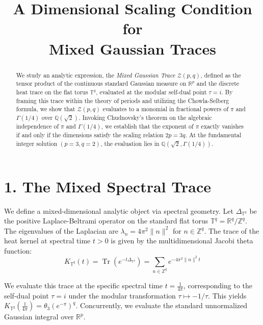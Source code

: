 \documentclass[12pt]{article}
\begin{document}
\title{\textbf{A Dimensional Scaling Condition for \\ Mixed Gaussian Traces}}
\author{}
\date{}
\maketitle

\begin{abstract}
\noindent We study an analytic expression, the \textit{Mixed Gaussian Trace} $\mathcal{Z}(p, q)$, defined as the tensor product of the continuous standard Gaussian measure on $\mathbb{R}^p$ and the discrete heat trace on the flat torus $\mathbb{T}^q$, evaluated at the modular self-dual point $\tau = i$. By framing this trace within the theory of periods and utilizing the Chowla-Selberg formula, we show that $\mathcal{Z}(p, q)$ evaluates to a monomial in fractional powers of $\pi$ and $\Gamma(1/4)$ over $\mathbb{Q}(\sqrt{2})$. Invoking Chudnovsky's theorem on the algebraic independence of $\pi$ and $\Gamma(1/4)$, we establish that the exponent of $\pi$ exactly vanishes if and only if the dimensions satisfy the scaling relation $2p = 3q$. At the fundamental integer solution $(p=3, q=2)$, the evaluation lies in $\mathbb{Q}(\sqrt{2}, \Gamma(1/4))$.
\end{abstract}

\vspace{0.5cm}

\section*{1. The Mixed Spectral Trace}
We define a mixed-dimensional analytic object via spectral geometry. Let $\Delta_{\mathbb{T}^q}$ be the positive Laplace-Beltrami operator on the standard flat torus $\mathbb{T}^q = \mathbb{R}^q / \mathbb{Z}^q$. The eigenvalues of the Laplacian are $\lambda_n = 4\pi^2 \|n\|^2$ for $n \in \mathbb{Z}^q$. The trace of the heat kernel at spectral time $t > 0$ is given by the multidimensional Jacobi theta function:
\begin{equation}
    K_{\mathbb{T}^q}(t) = \operatorname{Tr}\left(e^{-t\Delta_{\mathbb{T}^q}}\right) = \sum_{n \in \mathbb{Z}^q} e^{-4\pi^2 \|n\|^2 t}
\end{equation}

We evaluate this trace at the specific spectral time $t = \frac{1}{4\pi}$, corresponding to the self-dual point $\tau = i$ under the modular transformation $\tau \mapsto -1/\tau$. This yields $K_{\mathbb{T}^q}\left(\frac{1}{4\pi}\right) = \theta_3(e^{-\pi})^q$. Concurrently, we evaluate the standard unnormalized Gaussian integral over $\mathbb{R}^p$.
\end{document}
